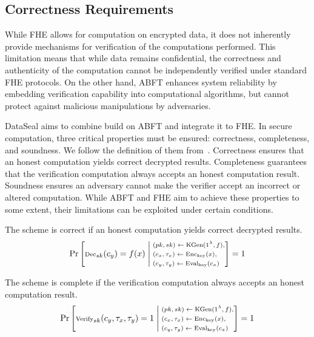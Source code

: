 \subsection{Correctness Requirements}

While FHE allows for computation on encrypted data, it does not inherently provide mechanisms for verification of the computations performed. This limitation means that while data remains confidential, the correctness and authenticity of the computation cannot be independently verified under standard FHE protocols. On the other hand, ABFT enhances system reliability by embedding verification capability into computational algorithms, but cannot protect against malicious manipulations by adversaries.

DataSeal aims to combine build on ABFT and integrate it to FHE. In secure computation, three critical properties must be ensured: correctness, completeness, and soundness. We follow the definition of them from~\cite{viand2023verifiable}. 
Correctness ensures that an honest computation yields correct decrypted results. Completeness guarantees that the verification computation always accepts an honest computation result. Soundness ensures an adversary cannot make the verifier accept an incorrect or altered computation. While ABFT and FHE aim to achieve these properties to some extent, their limitations can be exploited under certain conditions. 

\begin{definition}[Correctness]
The scheme is correct if an honest computation yields correct decrypted results.
\begin{equation}
\scriptsize
    \Pr\left[
    \text{Dec}_{sk}(c_y) = f(x)
    \;\middle|\;
    \begin{aligned}
        &(pk, sk) \leftarrow \text{KGen}(1^\lambda,f), \\
        &(c_x, \tau_x) \leftarrow \text{Enc}_{\text{key}}(x), \\
        &(c_y, \tau_y) \leftarrow \text{Eval}_{\text{key}}(c_x)
    \end{aligned}
    \right] = 1
\end{equation}
\end{definition}

\begin{definition}[Completeness]
The scheme is complete if the verification computation always accepts an honest computation result.
\begin{equation}
\scriptsize
    \Pr\left[
    \text{Verify}_{sk}(c_y, \tau_x, \tau_y) = 1
    \;\middle|\;
    \begin{aligned}
        &(pk, sk) \leftarrow \text{KGen}(1^\lambda,f), \\
        &(c_x, \tau_x) \leftarrow \text{Enc}_{\text{key}}(x), \\
        &(c_y, \tau_y) \leftarrow \text{Eval}_{\text{key}}(c_x)
    \end{aligned}
    \right] = 1
\end{equation}
\end{definition}


